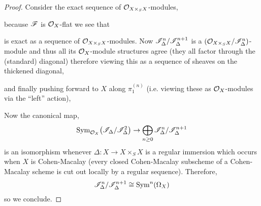 \documentclass[12pt]{article}
\begin{document}
\begin{proof}
Consider the exact sequence of $\mathcal{O}_{X \times_S X}$-modules,
\begin{center}
\end{center}
because $\mathscr{F}$ is $\mathcal{O}_{X}$-flat we see that
\begin{center}
\end{center}
is exact as a sequence of $\mathcal{O}_{X \times_S X}$-modules. Now $\mathscr{I}^n_{\Delta} / \mathscr{I}^{n+1}_\Delta$ is a $(\mathcal{O}_{X \times_S X} / \mathscr{I}^n_{\Delta})$-module and thus all its $\mathcal{O}_{X}$-module structures agree (they all factor through the (standard) diagonal) therefore viewing this as a sequence of sheaves on the thickened diagonal,
\begin{center}
\end{center}
and finally pushing forward to $X$ along $\pi_1^{(n)}$ (i.e. viewing these as $\mathcal{O}_{X}$-modules via the ``left'' action),
\begin{center}
\end{center}
Now the canonical map,
\[ \mathrm{Sym}_{\mathcal{O}_{X}}\! \left( \mathscr{I}_\Delta/\mathscr{I}_\Delta^2 \right) \to \bigoplus_{n \ge 0} \mathscr{I}^n_\Delta / \mathscr{I}^{n+1}_{\Delta} \]
is an isomorphism whenever $\Delta : X \to X \times_S X$ is a regular immersion which occurs when $X$ is Cohen-Macalay (every closed Cohen-Macalay subscheme of a Cohen-Macalay scheme is cut out locally by a regular sequence). Therefore,
\[ \mathscr{I}^n_\Delta / \mathscr{I}^{n+1}_\Delta \cong \mathrm{Sym}^{n}\! \left( \Omega_X \right) \]
so we conclude.
\end{proof}
\end{document}
